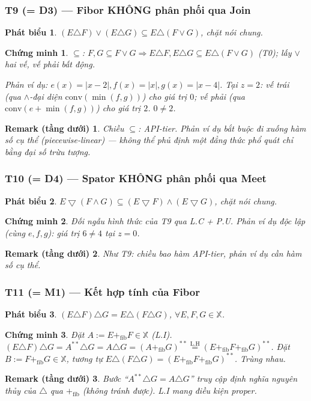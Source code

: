 \documentclass[11pt]{article}
\theoremstyle{plainlabel}
\newtheorem*{phatbieu}{Phát biểu}
\newtheorem*{chungminh}{Chứng minh}
\newtheorem*{remarkbox}{Remark (tầng dưới)}
\begin{document}
\subsubsection*{T9 (= D3) --- Fibor KHÔNG phân phối qua Join}
\begin{phatbieu} $(E\triangle F)\vee(E\triangle G)\subseteq E\triangle(F\vee G)$, chặt nói chung. \end{phatbieu}
\begin{chungminh}
$\subseteq$: $F,G\subseteq F\vee G\Rightarrow E\triangle F,E\triangle G\subseteq E\triangle(F\vee G)$ (T0); lấy $\vee$ hai vế, vế phải bất động.

Phản ví dụ: $e(x)=|x-2|,f(x)=|x|,g(x)=|x-4|$. Tại $z=2$: vế trái (qua $\wedge$-đại diện $\mathrm{conv}(\min(f,g))$) cho giá trị $0$; vế phải (qua $\mathrm{conv}(e+\min(f,g))$) cho giá trị $2$. $0\neq2$.
\end{chungminh}
\begin{remarkbox} Chiều $\subseteq$: API-tier. Phản ví dụ bắt buộc đi xuống hàm số cụ thể (piecewise-linear) — không thể phủ định một đẳng thức phổ quát chỉ bằng đại số trừu tượng. \end{remarkbox}

\subsubsection*{T10 (= D4) --- Spator KHÔNG phân phối qua Meet}
\begin{phatbieu} $E\bigtriangledown(F\wedge G)\subseteq(E\bigtriangledown F)\wedge(E\bigtriangledown G)$, chặt nói chung. \end{phatbieu}
\begin{chungminh} Đối ngẫu hình thức của T9 qua L.C + P.U. Phản ví dụ độc lập (cùng $e,f,g$): giá trị $6\neq4$ tại $z=0$. \end{chungminh}
\begin{remarkbox} Như T9: chiều bao hàm API-tier, phản ví dụ cần hàm số cụ thể. \end{remarkbox}

\subsubsection*{T11 (= M1) --- Kết hợp tính của Fibor}
\begin{phatbieu} $(E\triangle F)\triangle G=E\triangle(F\triangle G)$, $\forall E,F,G\in\mathbb X$. \end{phatbieu}
\begin{chungminh}
Đặt $A:=E+_{\mathrm{fib}}F\in\mathbb X$ (L.I). $(E\triangle F)\triangle G=A^{**}\triangle G=A\triangle G=(A+_{\mathrm{fib}}G)^{**}\overset{\text{L.H}}{=}(E+_{\mathrm{fib}}F+_{\mathrm{fib}}G)^{**}$. Đặt $B:=F+_{\mathrm{fib}}G\in\mathbb X$, tương tự $E\triangle(F\triangle G)=(E+_{\mathrm{fib}}F+_{\mathrm{fib}}G)^{**}$. Trùng nhau.
\end{chungminh}
\begin{remarkbox} Bước ``$A^{**}\triangle G=A\triangle G$'' truy cập định nghĩa nguyên thủy của $\triangle$ qua $+_{\mathrm{fib}}$ (không tránh được). L.I mang điều kiện proper. \end{remarkbox}
\end{document}
